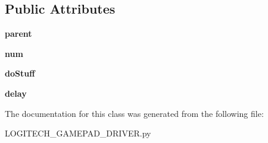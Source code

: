 \subsection*{Public Attributes}
\begin{DoxyCompactItemize}
\item 
\hypertarget{classdriver_1_1LOGITECH__GAMEPAD__DRIVER_1_1LogitechGamepadDriver_1_1GamepadThread_abede3a32608fc0d308e1cebcbd507eef}{}{\bfseries parent}\label{classdriver_1_1LOGITECH__GAMEPAD__DRIVER_1_1LogitechGamepadDriver_1_1GamepadThread_abede3a32608fc0d308e1cebcbd507eef}

\item 
\hypertarget{classdriver_1_1LOGITECH__GAMEPAD__DRIVER_1_1LogitechGamepadDriver_1_1GamepadThread_a01174be3f4261cd2dc0510a95907ae24}{}{\bfseries num}\label{classdriver_1_1LOGITECH__GAMEPAD__DRIVER_1_1LogitechGamepadDriver_1_1GamepadThread_a01174be3f4261cd2dc0510a95907ae24}

\item 
\hypertarget{classdriver_1_1LOGITECH__GAMEPAD__DRIVER_1_1LogitechGamepadDriver_1_1GamepadThread_a013099b962d25f2d0b6ed991527ba55b}{}{\bfseries do\+Stuff}\label{classdriver_1_1LOGITECH__GAMEPAD__DRIVER_1_1LogitechGamepadDriver_1_1GamepadThread_a013099b962d25f2d0b6ed991527ba55b}

\item 
\hypertarget{classdriver_1_1LOGITECH__GAMEPAD__DRIVER_1_1LogitechGamepadDriver_1_1GamepadThread_aefd0103bf5744b989ad40c8545f35388}{}{\bfseries delay}\label{classdriver_1_1LOGITECH__GAMEPAD__DRIVER_1_1LogitechGamepadDriver_1_1GamepadThread_aefd0103bf5744b989ad40c8545f35388}

\end{DoxyCompactItemize}


The documentation for this class was generated from the following file\+:\begin{DoxyCompactItemize}
\item 
L\+O\+G\+I\+T\+E\+C\+H\+\_\+\+G\+A\+M\+E\+P\+A\+D\+\_\+\+D\+R\+I\+V\+E\+R.\+py\end{DoxyCompactItemize}
